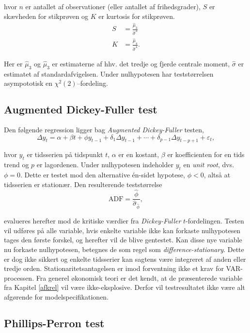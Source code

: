 \documentclass[
  a4paper,
  oneside]{memoir}
\begin{document}
hvor \(n\) er antallet af observationer (eller antallet af frihedsgrader), \(S\) er skævheden for stikprøven og \(K\) er kurtosis for stikprøven.
\begin{align*}
S&=\frac{\hat{\mu}_3}{\hat{\sigma}^3}\\
K&=\frac{\hat{\mu}_4}{\hat{\sigma}^4}.
\end{align*}

Her er \(\hat{\mu}_3\) og \(\hat{\mu}_3\) er estimaterne af hhv. det tredje og fjerde centrale moment, \(\hat{\sigma}\) er estimatet af standardafvigelsen. Under nulhypotesen har teststørrelsen asympototisk en \(\chi^2(2)\)--fordeling.

\hypertarget{augmented-dickey-fuller-test}{%
\subsection{Augmented Dickey-Fuller test}\label{augmented-dickey-fuller-test}}

Den følgende regression ligger bag \emph{Augmented Dickey-Fuller} testen, \citep{Dickey1979}
\[\Delta y_{t} = \alpha + \beta t + \phi y_{t-1} + \delta_1 \Delta y_{t-1} + \cdots + \delta_{p-1}\Delta y_{t-p+1} + \varepsilon_t,\]

hvor \(y_t\) er tidsserien på tidspunkt \(t\), \(\alpha\) er en kostant, \(\beta\) er koefficienten for en tids trend og \(p\) er lagordenen. Under nulhypotesen indeholder \(y_t\) en \emph{unit root}, dvs. \(\phi=0\). Dette er testet mod den alternative én-sidet hypotese, \(\phi<0\), altså at tidsserien er stationær. Den resulterende teststørrelse
\[\text{ADF}=\frac{\hat{\phi}}{\hat{\sigma}_{\hat{\phi}}},\]

evalueres herefter mod de kritiske værdier fra \emph{Dickey-Fuller} \(t\)-fordelingen. Testen vil udføres på alle variable, hvis enkelte variable ikke kan forkaste nulhypotesen tages den første forskel, og herefter vil de blive gentestet. Kan disse nye variable nu forkaste nulhypotesen, betegnes de som regel som \emph{difference-stationary}. Dette er dog ikke sikkert og enkelte tidsserier kan sagtens være integreret af anden eller tredje orden. Stationaritetsantagelsen er imod forventning ikke et krav for VAR-processen. Fra generel økonomisk teori er det kendt, at de præsenterede variable fra Kapitel \ref{afkrel} vil være ikke-eksplosive. Derfor vil testresultatet ikke være alt afgørende for modelspecifikationen.

\hypertarget{phillips-perron-test}{%
\subsection{Phillips-Perron test}\label{phillips-perron-test}}
\end{document}

